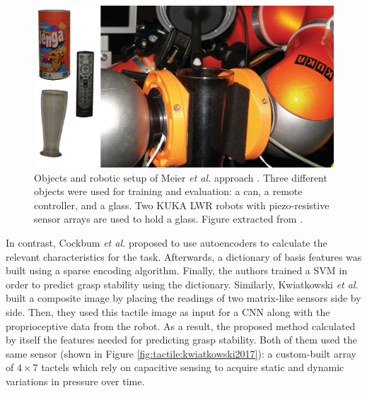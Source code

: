 \begin{figure}[!htb]
    \centering
    \includegraphics[width=\linewidth]{Figures/Tactile/meier2016.png}
    \caption{Objects and robotic setup of Meier \emph{et al.} approach \cite{Meier2016a}. Three different objects were used for training and evaluation: a can, a remote controller, and a glass. Two KUKA LWR robots with piezo-resistive sensor arrays are used to hold a glass. Figure extracted from \cite{Meier2016a}.}
    \label{fig:tactile:meier2016}
\end{figure}

In contrast, Cockbum \emph{et al.} \cite{Cockbum2017} proposed to use autoencoders to calculate the relevant characteristics for the task. Afterwards, a dictionary of basis features was built using a sparse encoding algorithm. Finally, the authors trained a \ac{SVM} in order to predict grasp stability using the dictionary. Similarly, Kwiatkowski \emph{et al.} \cite{Kwiatkowski2017} built a composite image by placing the readings of two matrix-like sensors side by side. Then, they used this tactile image as input for a \ac{CNN} along with the proprioceptive data from the robot. As a result, the proposed method calculated by itself the features needed for predicting grasp stability. Both of them used the same sensor (shown in Figure \ref{fig:tactile:kwiatkowski2017}): a custom-built array of $4\times 7$ tactels which rely on capacitive sensing to acquire static and dynamic variations in pressure over time.

